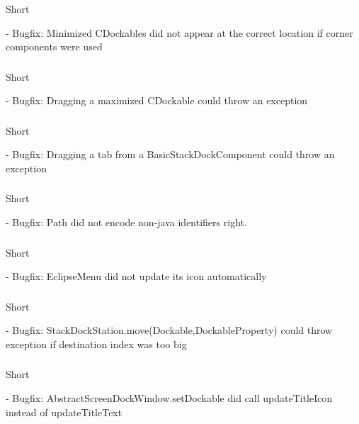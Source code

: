 \documentclass[a4paper,10pt]{article}
\newcommand{\short}{\item[Short]}
\begin{document}
\subsubsection{}
\begin{description}
 \short 
\end{description}
- Bugfix: Minimized CDockables did not appear at the correct location if corner components were used
\subsubsection{}
\begin{description}
 \short 
\end{description}
- Bugfix: Dragging a maximized CDockable could throw an exception
\subsubsection{}
\begin{description}
 \short 
\end{description}
- Bugfix: Dragging a tab from a BasicStackDockComponent could throw an exception
\subsubsection{}
\begin{description}
 \short 
\end{description}
- Bugfix: Path did not encode non-java identifiers right.
\subsubsection{}
\begin{description}
 \short 
\end{description}
- Bugfix: EclipseMenu did not update its icon automatically
\subsubsection{}
\begin{description}
 \short 
\end{description}
- Bugfix: StackDockStation.move(Dockable,DockableProperty) could throw exception if destination index was too big
\subsubsection{}
\begin{description}
 \short 
\end{description}
- Bugfix: AbstractScreenDockWindow.setDockable did call updateTitleIcon instead of updateTitleText
\end{document}
